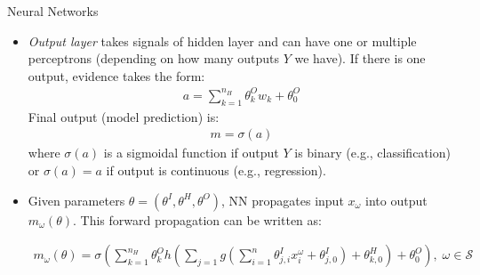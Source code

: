 \documentclass[9pt]{beamer}
\begin{document}

\begin{frame}{Neural Networks}
\begin{itemize}
\item {\em Output layer} takes signals of hidden layer and can have one or multiple perceptrons (depending on how many outputs $Y$ we have). If there is one output,  evidence takes the form:
\begin{align*}
a=\sum_{k=1}^{n_H}\theta_{k}^{O}w_k+\theta_{0}^O
\end{align*}
Final output (model prediction) is:
\begin{align*}
m=\sigma(a)
\end{align*}
where $\sigma(a)$ is a sigmoidal function if output $Y$ is binary (e.g., classification) or $\sigma(a)=a$ if output is continuous (e.g., regression). 

\item Given parameters $\theta=(\theta^I,\theta^H,\theta^O)$, NN propagates input $x_\omega$ into output $m_{\omega}(\theta)$. This forward propagation can be written as:
\begin{block}{}
\begin{align*}
m_{\omega}(\theta)
=\sigma\left(\sum_{k=1}^{n_H}\theta_{k}^Oh\left(\sum_{j=1}g\left(\sum_{i=1}^n\theta_{j,i}^Ix_i^\omega+\theta_{j,0}^I\right)+\theta_{k,0}^H\right)+\theta_0^O\right),\; \omega \in \mathcal{S}
\end{align*}
\end{block}

\end{itemize}

\end{frame}

\end{document}
